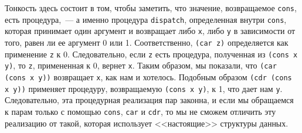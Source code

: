 Тонкость здесь состоит в том, чтобы заметить, что значение,
возвращаемое {\tt cons}, есть процедура,~--- а именно процедура 
{\tt dispatch}, определенная внутри {\tt cons}, которая
принимает один аргумент и возвращает либо {\tt x}, либо
{\tt y} в зависимости от того, равен ли ее аргумент 0 или 1.
Соответственно, {\tt (car z)} определяется как применение
{\tt z} к 0.  Следовательно, если {\tt z} есть
процедура, полученная из {\tt (cons x y)}, то {\tt z},
примененная к 0, вернет {\tt x}.  Таким образом, мы показали,
что {\tt (car (cons x y))} возвращает {\tt x}, как нам и 
хотелось.  Подобным образом {\tt (cdr (cons x y))} применяет
процедуру, возвращаемую {\tt (cons x y)}, к 1, что дает нам
{\tt y}.  Следовательно, эта процедурная реализация пар
законна, и если мы обращаемся к парам только с помощью
{\tt cons}, {\tt car} и 
{\tt cdr}, то мы не сможем отличить эту реализацию от такой,
которая использует <<настоящие>> структуры данных.

